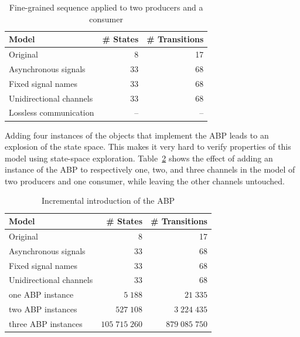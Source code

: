 \begin{table}[hbt]
\centering
\small
\begin{tabular}{|l|r|r|}
\hline
\rowcolor[gray]{.9}
 \textbf{Model}          & \textbf{\# States} & \textbf{\# Transitions} \\
\hline
 Original                & 8                  & 17 \\
\hline
 Asynchronous signals    & 33                 & 68 \\
\hline
 Fixed signal names      & 33                 & 68 \\
\hline
 Unidirectional channels & 33                 & 68 \\
\hline
 Lossless communication  & --                 & -- \\
\hline
\end{tabular}
\caption{Fine-grained sequence applied to two producers and a consumer}
\label{tab:simpledouble_fine_grained}
\end{table}

Adding four instances of the objects that implement the ABP leads to an explosion of the state space.
This makes it very hard to verify properties of this model using state-space exploration.
Table~\ref{tab:simpledouble_fine_grained_partial} shows the effect of adding an instance of the ABP to respectively one, two, and three channels in the model of two producers and one consumer, while leaving the other channels untouched.

\begin{table}[hbt]
\centering
\small
\begin{tabular}{|l|r|r|}
\hline
\rowcolor[gray]{.9}
 \textbf{Model}             & \textbf{\# States} & \textbf{\# Transitions} \\
\hline
 Original                   & 8                  & 17 \\
\hline
 Asynchronous signals       & 33                 & 68 \\
\hline
 Fixed signal names         & 33                 & 68 \\
\hline
 Unidirectional channels    & 33                 & 68 \\
\hline
 one ABP instance           & $5\;188$           & $21\;335$ \\
\hline
 two ABP instances          & $527\;108$         & $3\;224\;435$ \\
\hline
 three ABP instances        & $105\;715\;260$    & $879\;085\;750$ \\
\hline
\end{tabular}
\caption{Incremental introduction of the ABP}
\label{tab:simpledouble_fine_grained_partial}
\end{table}

